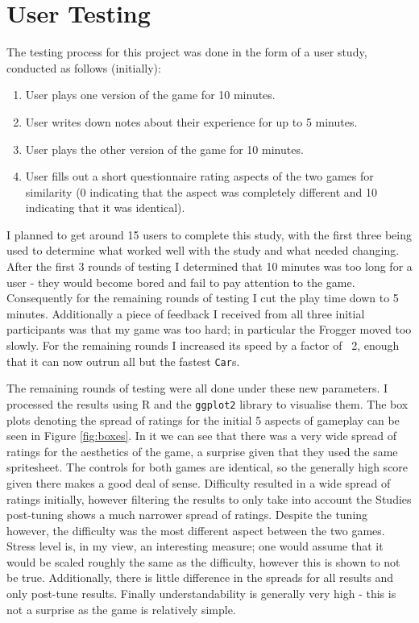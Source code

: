 \documentclass[12pt, a4paper]{report}
\begin{document}
\section{User Testing}

The testing process for this project was done in the form of a user study, conducted as follows (initially):
\begin{enumerate}
  \item User plays one version of the game for 10 minutes.
  \item User writes down notes about their experience for up to 5 minutes.
  \item User plays the other version of the game for 10 minutes.
  \item User fills out a short questionnaire rating aspects of the two games for similarity (0 indicating that the aspect was completely different and 10 indicating that it was identical).
\end{enumerate}

I planned to get around 15 users to complete this study, with the first three being used to determine what worked well with the study and what needed changing.
After the first 3 rounds of testing I determined that 10 minutes was too long for a user - they would become bored and fail to pay attention to the game.
Consequently for the remaining rounds of testing I cut the play time down to 5 minutes.
Additionally a piece of feedback I received from all three initial participants was that my game was too hard; in particular the Frogger moved too slowly.
For the remaining rounds I increased its speed by a factor of ~2, enough that it can now outrun all but the fastest \verb|Car|s.

\par

The remaining rounds of testing were all done under these new parameters.
I processed the results using R and the \verb|ggplot2| library to visualise them.
The box plots denoting the spread of ratings for the initial 5 aspects of gameplay can be seen in Figure \ref{fig:boxes}.
In it we can see that there was a very wide spread of ratings for the aesthetics of the game, a surprise given that they used the same spritesheet.
The controls for both games are identical, so the generally high score given there makes a good deal of sense.
Difficulty resulted in a wide spread of ratings initially, however filtering the results to only take into account the Studies post-tuning shows a much narrower spread of ratings.
Despite the tuning however, the difficulty was the most different aspect between the two games.
Stress level is, in my view, an interesting measure; one would assume that it would be scaled roughly the same as the difficulty, however this is shown to not be true.
Additionally, there is little difference in the spreads for all results and only post-tune results.
Finally understandability is generally very high - this is not a surprise as the game is relatively simple.
\end{document}
